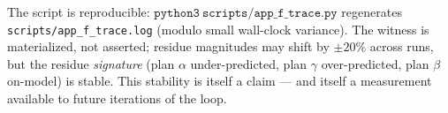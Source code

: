 The script is reproducible: $\mathtt{python3\
scripts/app\_f\_trace.py}$ regenerates
\verb|scripts/app_f_trace.log| (modulo small
wall-clock variance). The witness is materialized,
not asserted; residue magnitudes may shift by
$\pm 20\%$ across runs, but the residue
\emph{signature} (plan $\alpha$ under-predicted, plan
$\gamma$ over-predicted, plan $\beta$ on-model) is
stable. This stability is itself a claim --- and
itself a measurement available to future iterations
of the loop.
